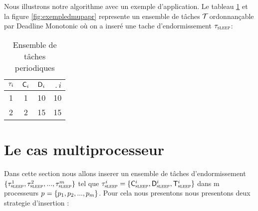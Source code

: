 Nous illustrons notre algorithme avec un
exemple d'application. Le tableau \ref{tab:exempledmup} et la figure
\ref{fig:exempledmupapr} represente un ensemble de tâches $\mathcal{T}_{}$
ordonnançable par Deadline Monotonic où on a inseré une tache
d'endormissement $\tau_{\textsc{sleep}}$:

\begin{table}[!h]
\begin{center}
\begin{tabular}{|c|c|c|c|}
 \hline$\tau_{i}$ & $\mathsf{C}_{i}$ & $\mathsf{D}_{i}$ & $\period{i}$ \\ 
 \hline 1 & 1 & 10 & 10 \\ 
 \hline 2 & 2 & 15 & 15 \\ 
 \hline 
 \end{tabular}
\end{center}
\caption{Ensemble de t\^aches periodiques} \label{tab:exempledmup}
\end{table}






\section{Le cas multiprocesseur}
Dans cette section nous allons inserer un ensemble de tâches
d'endormissement
$\{\tau_{\textsc{sleep}}^1,\tau_{\textsc{sleep}}^2,...,\tau_{\textsc{sleep}}^m\}$ tel que
$\tau_{\textsc{sleep}}^i = \{ \mathsf{C}_{\textsc{sleep}}^i, \mathsf{D}_{\textsc{sleep}}^i,
\mathsf{T}_{\textsc{sleep}}^i\}$ dans m processeurs $p_{} =
\{p_{1},p_{2},...,p_{m}\}$.  \indent Pour cela nous
presentons nous presentons deux strategie d'insertion :

